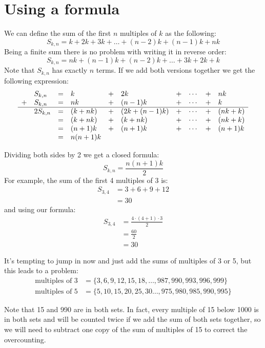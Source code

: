 \documentclass{article}
\begin{document}
\section*{Using a formula}
We can define the sum of the first \(n\) multiples of \(k\) as the following:
\[ S_{k, n} = k + 2k + 3k + \dots + (n-2)k + (n-1)k + nk \]
Being a finite sum there is no problem with writing it in reverse order:
\[ S_{k, n} = nk + (n-1)k + (n-2)k + \dots + 3k + 2k + k \]
Note that \(S_{k,n}\) has exactly \(n\) terms. If we add both versions together
we get the following expression:
\[ \begin{array}{rlllllllllll}
    & S_{k, n} &= &k &+ &2k &+ &\cdots &+ &nk \\
    + & S_{k, n} &= &nk &+ &(n-1)k &+ &\cdots &+ &k \\
    \hline & 2S_{k, n} &= &(k+nk) &+ &(2k+(n-1)k) &+ &\cdots &+ &(nk+k) \\
    & &= &(k + nk) &+ &(k + nk) &+ &\cdots &+ &(nk + k) \\
    & &= &(n+1)k &+ &(n+1)k &+ &\cdots &+ &(n+1)k \\
    & &= &n(n+1)k \end{array}
\]

Dividing both sides by 2 we get a closed formula:
\[ S_{k, n} = \frac{n(n+1)k}{2} \]
For example, the sum of the first 4 multiples of 3 is:
\[ \begin{aligned}
    S_{3, 4} &= 3 + 6 + 9 + 12 \\
    &= 30
\end{aligned} \]
and using our formula:
\[ \begin{aligned}
    S_{3, 4} &= \frac{4 \cdot (4+1) \cdot 3}{2} \\
    &= \frac{60}{2} \\
    &= 30
\end{aligned} \]

It's tempting to jump in now and just add the sums of multiples of 3 or 5, but
this leads to a problem:
\[ \begin{aligned}
    \text{multiples of 3} &= \{3, 6, 9, 12, 15, 18, \dots, 987, 990, 993, 996,
                               999\} \\
    \text{multiples of 5} &= \{5, 10, 15, 20, 25, 30 \dots, 975, 980, 985, 990,
                               995\}
\end{aligned} \]

Note that 15 and 990 are in both sets. In fact, every multiple of 15 below 1000
is in both sets and will be counted twice if we add the sum of both sets
together, so we will need to subtract one copy of the sum of multiples of 15 to
correct the overcounting.
\end{document}
